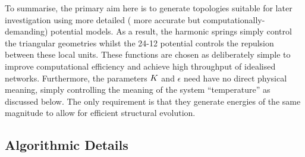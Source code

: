 To summarise, the primary aim here is to generate topologies suitable for later investigation using more detailed (\ie{} more accurate but
computationally\--demanding) potential models. 
As a result, the harmonic springs simply control the triangular geometries whilst the 24-12 potential controls the repulsion between these local units. 
These functions are chosen as deliberately simple to improve computational efficiency and achieve high throughput of idealised networks. 
Furthermore, the parameters $K$ and $\epsilon$ need have no direct physical meaning, simply controlling the
meaning of the system ``temperature'' as discussed below. 
The only requirement is that they generate energies of the same magnitude to allow for efficient
structural evolution.


\subsection{Algorithmic Details}


